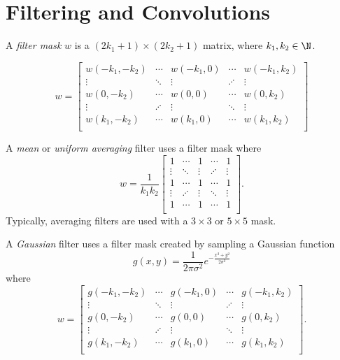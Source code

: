 \documentclass[12pt]{article}
\begin{document}
\section{Filtering and Convolutions}

\begin{defn}
    A \emph{filter mask} $w$ is a $(2k_1 + 1) \times (2k_2 + 1)$ matrix, where $k_1, k_2 \in \N$.

    \[w = \begin{bmatrix}
        w{(-k_1, -k_2)} & \cdots & w{(-k_1, 0)} & \cdots & w{(-k_1, k_2)} \\
        \vdots & \ddots & \vdots & \iddots & \vdots \\
        w{(0, -k_2)} & \cdots & w{(0, 0)} & \cdots & w{(0, k_2)} \\
        \vdots & \iddots & \vdots & \ddots & \vdots \\
        w{(k_1, -k_2)} & \cdots & w{(k_1, 0)} & \cdots & w{(k_1, k_2)} \\
    \end{bmatrix}\]
\end{defn}

\begin{exmp}
    A \emph{mean} or \emph{uniform averaging} filter uses a filter mask where
    \[w = \frac{1}{k_1k_2}\begin{bmatrix}
        1 & \cdots & 1 & \cdots & 1 \\
        \vdots & \ddots & \vdots & \iddots & \vdots \\
        1 & \cdots & 1 & \cdots & 1 \\
        \vdots & \iddots & \vdots & \ddots & \vdots \\
        1 & \cdots & 1 & \cdots & 1 \\
    \end{bmatrix}.\] Typically, averaging filters are used with a $3 \times 3$ or $5 \times 5$ mask.
\end{exmp}

\begin{exmp}
    A \emph{Gaussian} filter uses a filter mask created by sampling a Gaussian function \[g(x, y) = \frac{1}{2\pi\sigma^2}e^{-\frac{x^2+y^2}{2\sigma^2}}\] where
    \[w = \begin{bmatrix}
        g(-k_1, -k_2) & \cdots & g(-k_1, 0) & \cdots & g(-k_1, k_2) \\
        \vdots & \ddots & \vdots & \iddots & \vdots \\
        g(0, -k_2) & \cdots & g(0, 0) & \cdots & g(0, k_2) \\
        \vdots & \iddots & \vdots & \ddots & \vdots \\
        g(k_1, -k_2) & \cdots & g(k_1, 0) & \cdots & g(k_1, k_2) \\
    \end{bmatrix}.\]
\end{exmp}
\end{document}
